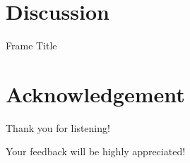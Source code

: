 \documentclass{beamer}
\begin{document}
\section{Discussion}
\begin{frame}{Frame Title}
    
\end{frame}

\section{Acknowledgement}  
\begin{frame}
\textcolor{cityugreen}{\large{\centerline{Thank you for listening! }}}
\textcolor{cityugreen}{\large{\centerline{ Your feedback will be highly appreciated!}}}
\end{frame}
\end{document}
